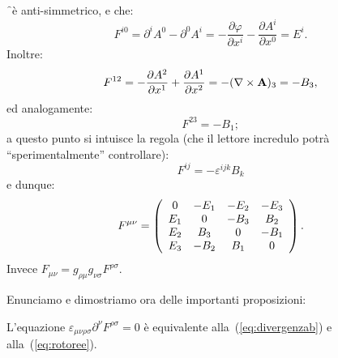 \begin{osservazione}
  \f \ \`e anti-simmetrico, e che:
$$
F^{i0} = \partial^i A^0 - \partial^0 A^i = -\frac{\partial
  \varphi}{\partial x^i} - \frac{\partial A^i}{\partial x^0} = E^i.
$$
Inoltre:
$$
F^{12} = - \frac{\partial A^2}{\partial x^1} + \frac{\partial
  A^1}{\partial x^2} = - (\mathbf{\nabla \times A})_3 = - B_3,
$$
ed analogamente:
$$
F^{23} = - B_1;
$$
a questo punto si intuisce la regola (che il lettore incredulo potr\`a
``sperimentalmente'' controllare):
\begin{equation}
  F^{ij} = - \varepsilon^{ijk}B_{k} \label{eq:fepsilon}
\end{equation}
e dunque:
\begin{equation}
  F^{\mu\nu}= \left(
    \begin{array}{cccc}
      0    &  -E_1  &  -E_2  &  -E_3 \\
      E_1  &    0   &  -B_3  &   B_2 \\
      E_2  &   B_3  &    0   &  -B_1 \\
      E_3  &  -B_2  &   B_1  &    0  \\
    \end{array}
  \right).
\end{equation}
Invece $F_{\mu\nu} = g_{\rho \mu} g_{\nu \sigma} F^{\rho \sigma}$.
\end{osservazione}
Enunciamo e dimostriamo ora delle importanti proposizioni:
\begin{proposizione}
  L'equazione $ \varepsilon_{\mu\nu\rho\sigma}
  \partial^{\nu} F^{\rho\sigma} = 0 $ \`e equivalente
  alla~(\ref{eq:divergenzab}) e alla~(\ref{eq:rotoree}).
\end{proposizione}
